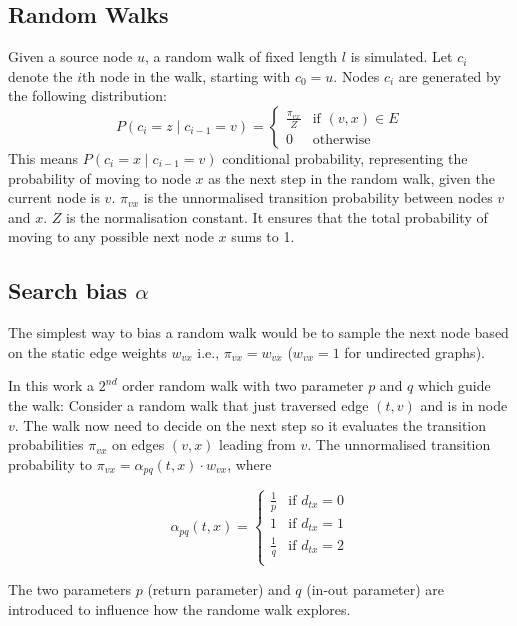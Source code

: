 \documentclass{article}
\begin{document}
\subsection{Random Walks}
Given a source node $u$, a random walk of fixed length $l$ is simulated. Let
$c_i$ denote the $i$th node in the walk, starting with $c_0 = u$. Nodes $c_i$
are generated by the following distribution:
\begin{equation}
  P(c_i = z \mid c_{i-1} = v) =
  \begin{cases}
    \frac{\pi_{vx}}{Z} & \text{if } (v, x) \in E \\
    0 & \text{otherwise} 
  \end{cases}
  \label{eq:5}
\end{equation}
This means $P(c_i = x \mid c_{i-1} = v)$ conditional probability, representing
the probability of moving to node $x$ as the next step in the random walk,
given the current node is $v$. $\pi_{vx}$ is the unnormalised transition
probability between nodes $v$ and $x$. $Z$ is the normalisation constant. It
ensures that the total probability of moving to any possible next node $x$ sums
to 1. 

\subsection{Search bias $\alpha$}
The simplest way to bias a random walk would be to sample the next node based
on the static edge weights $w_{vx}$ i.e., $\pi_{vx} = w_{vx}$ ($w_{vx} = 1$ for
undirected graphs).

In this work a $2^{nd}$ order random walk with two parameter $p$ and $q$ which
guide the walk: Consider a random walk that just traversed edge $(t,v)$ and is
in node $v$. The walk now need  to decide on the next step so it evaluates the
transition probabilities $\pi_{vx}$ on edges $(v,x)$ leading from $v$. The
unnormalised transition probability to $\pi_{vx} = \alpha_{pq}(t,x)\cdot
w_{vx}$, where

\begin{equation}
  \alpha_{pq}(t,x)=
  \begin{cases}
    \frac{1}{p} & \text{if } d_{tx} = 0 \\
    1 & \text{if } d_{tx} = 1 \\
    \frac{1}{q} & \text{if } d_{tx} = 2 \\
  \end{cases}
  \label{eq:6}
\end{equation}

The two parameters $p$ (return parameter) and $q$ (in-out parameter) are
introduced to influence how the randome walk explores.
\end{document}
